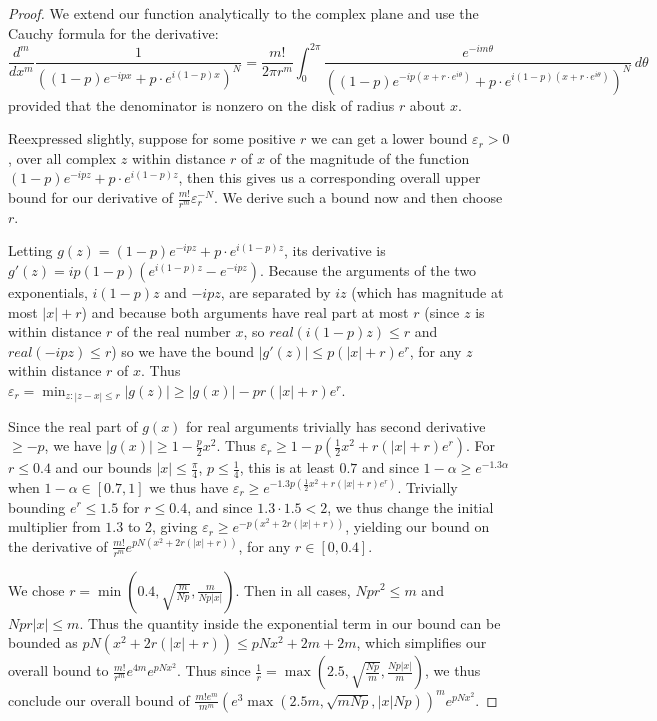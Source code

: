 \documentclass[11pt]{article}
\theoremstyle{plain}
\newcommand{\eps}{\varepsilon}
\begin{document}
\begin{proof}
We extend our function analytically to the complex plane and use the Cauchy formula for the derivative: 
\[\frac{d^m}{dx^m}\frac{1}{((1-p)e^{-i p x}+p\cdot e^{i (1-p)x})^N}=\frac{m!}{2\pi r^m}\int_{0}^{2\pi } \frac{e^{-i m\theta}}{((1-p)e^{-i p (x+r\cdot e^{i\theta})}+p\cdot e^{i (1-p)(x+r\cdot e^{i\theta})})^N}\,d\theta\]
provided that the denominator is nonzero on the disk of radius $r$ about $x$.

Reexpressed slightly, suppose for some positive $r$ we can get a lower bound $\eps_r>0$, over all complex $z$ within distance $r$ of $x$ of the magnitude of the function $(1-p)e^{-ipz}+p\cdot e^{i(1-p)z}$, then this gives us a corresponding overall upper bound for our derivative of $\frac{m!}{r^m} \eps_r^{-N}$. We derive such a bound now and then choose $r$.

Letting $g(z)=(1-p)e^{-ipz}+p\cdot e^{i(1-p)z}$, its derivative is $g'(z)=i p(1-p)(e^{i (1-p)z}-e^{-i p z})$. Because the arguments of the two exponentials, $i(1-p)z$ and $-ipz$, are separated by $iz$ (which has magnitude at most $|x|+r$) and because both arguments have real part at most $r$ (since $z$ is within distance $r$ of the real number $x$, so $real(i(1-p)z)\leq r$ and $real(-ipz)\leq r$) so we have the bound $|g'(z)|\leq p (|x|+r)e^r$, for any $z$ within distance $r$ of $x$. Thus $\eps_r=\min_{z:|z-x|\leq r}|g(z)|\geq |g(x)|-p r (|x|+r) e^r$.

Since the real part of $g(x)$ for real arguments trivially has second derivative $\geq -p$, we have $|g(x)|\geq 1-\frac{p}{2} x^2$. Thus $\eps_r\geq 1-p(\frac{1}{2}x^2 +r(|x|+r)e^r)$. For $r\leq 0.4$ and our bounds $|x|\leq\frac{\pi}{4}$, $p\leq \frac{1}{4}$, this is at least $0.7$ and since $1-\alpha\geq e^{-1.3\alpha}$ when $1-\alpha\in[0.7,1]$ we thus have $\eps_r\geq e^{-1.3 p(\frac{1}{2}x^2 +r(|x|+r)e^r)}$. Trivially bounding $e^r\leq 1.5$ for $r\leq 0.4$, and since $1.3\cdot 1.5<2$, we thus change the initial multiplier from $1.3$ to 2, giving $\eps_r\geq e^{-p(x^2+2r(|x|+r))}$, yielding our bound on the derivative of $\frac{m!}{r^m}e^{pN(x^2+2r(|x|+r))}$, for any $r\in [0, 0.4]$.

We chose $r=\min(0.4,\sqrt{\frac{m}{Np}},\frac{m}{Np|x|})$. Then in all cases, $Npr^2\leq m$ and $Npr|x|\leq m$. Thus the quantity inside the exponential term in our bound can be bounded as $pN(x^2+2r(|x|+r))\leq pNx^2+2m+2m$, which simplifies our overall bound to $\frac{m!}{r^m}e^{4m}e^{pNx^2}$. Thus since $\frac{1}{r}=\max(2.5,\sqrt{\frac{Np}{m}},\frac{Np|x|}{m})$, we thus conclude our overall bound of $\frac{m!e^m}{m^m}(e^3\max(2.5 m,\sqrt{mNp},|x|Np))^{m}e^{pNx^2}$.
\end{proof}
\end{document}
